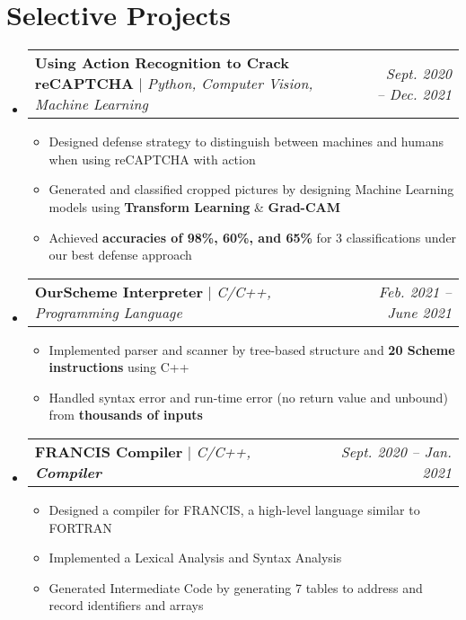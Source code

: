 \documentclass[letterpaper,11pt]{article}
\makeatletter
\newcommand{\HL}[1]{
  \textbf{\textcolor{DukeBlue}{#1}}
}
\newcommand{\subheadingtitlevspace}{
\vspace{-3pt}
}
\newcommand{\resumeItem}[1]{
  \item{
    {#1 \vspace{-4pt}}
  }
}
\newcommand{\titleItem}[1]{
  \textbf{#1}
}
\newcommand{\resumeProjectHeading}[2]{
    \item
    \begin{tabular*}{0.97\textwidth}{l@{\extracolsep{\fill}}r}
      #1 & \textit{ #2} \\
    \end{tabular*}\vspace{-9pt}
}
\newcommand{\resumeSubHeadingListStart}{\subheadingtitlevspace\begin{itemize}[leftmargin=0.15in, label={}]}
\newcommand{\resumeSubHeadingListEnd}{\end{itemize}}
\newcommand{\resumeItemListStart}{
\begin{itemize}}
\newcommand{\resumeItemListEnd}{
\end{itemize}\vspace{-8pt}}
\makeatother
\begin{document}
 \section{Selective Projects}    
  \resumeSubHeadingListStart
    \resumeProjectHeading
      {\titleItem{Using Action Recognition to Crack reCAPTCHA} $|$ \emph{Python, Computer Vision, Machine Learning}}{Sept. 2020 -- Dec. 2021}
      \resumeItemListStart
        \resumeItem{Designed defense strategy to distinguish between machines and humans when using reCAPTCHA with action}
        \resumeItem{Generated and classified cropped pictures by designing Machine Learning models using \HL{Transform Learning}\&\HL{Grad-CAM}}
        \resumeItem{Achieved \HL{accuracies of 98\%, 60\%, and 65\%} for 3 classifications under our best defense approach }
      \resumeItemListEnd
    \resumeProjectHeading
      {\titleItem{OurScheme Interpreter} $|$ \emph{C/C++, Programming Language}}{Feb. 2021 -- June 2021}
      \resumeItemListStart
        \resumeItem{Implemented parser and scanner by tree-based structure and \HL{20 Scheme instructions} using C++} 
        \resumeItem{Handled syntax error and run-time error (no return value and unbound) from \HL{thousands of inputs}}
      \resumeItemListEnd
    \resumeProjectHeading
      {\titleItem{FRANCIS Compiler} $|$ \emph{C/C++, \HL{Compiler}}}{Sept. 2020 -- Jan. 2021}
      \resumeItemListStart
        \resumeItem{Designed a compiler for FRANCIS, a high-level language similar to FORTRAN}
        \resumeItem{Implemented a Lexical Analysis and Syntax Analysis}
        \resumeItem{Generated Intermediate Code by generating 7 tables to address and record identifiers and arrays}
      \resumeItemListEnd
  \resumeSubHeadingListEnd


\end{document}
